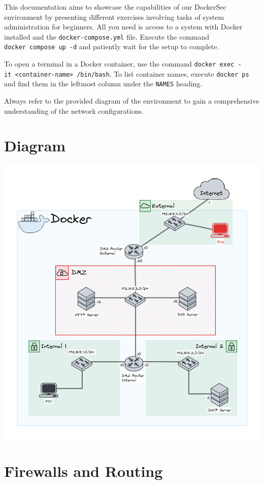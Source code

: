 \documentclass[a4paper,11pt,singlespacing]{article}
\begin{document}
This documentation aims to showcase the capabilities of our DockerSec
environment by presenting different exercises involving tasks of system
administration for beginners. All you need is access to a system with
Docker installed and the \texttt{docker-compose.yml} file. Execute the
command \texttt{docker\ compose\ up\ -d} and patiently wait for the
setup to complete.

To open a terminal in a Docker container, use the command
\texttt{docker\ exec\ -it\ \textless{}container-name\textgreater{}\ /bin/bash}.
To list container names, execute \texttt{docker\ ps} and find them in
the leftmost column under the \texttt{NAMES} heading.

Always refer to the provided diagram of the environment to gain a
comprehensive understanding of the network configurations.

\newpage

\section{Diagram}\label{diagram}

\includegraphics{Images/Diagram1.png}
\newpage

\section{Firewalls and Routing}\label{firewalls-and-routing}
\end{document}
